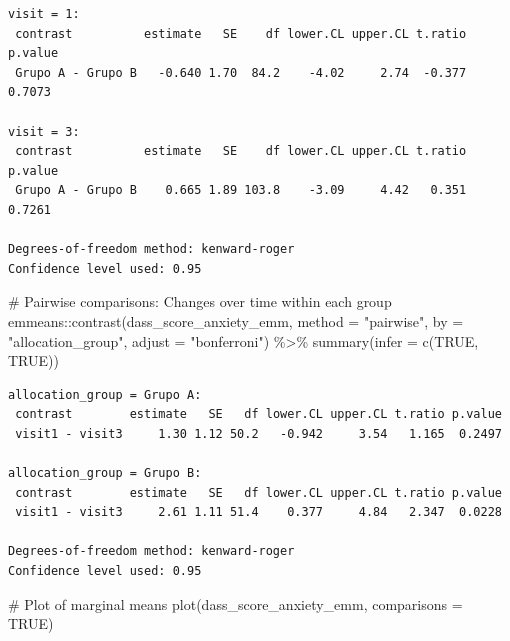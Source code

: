 \documentclass[
  letterpaper,
  DIV=11,
  numbers=noendperiod]{scrartcl}
\newenvironment{Shaded}{\begin{snugshade}}{\end{snugshade}}
\newcommand{\AttributeTok}[1]{\textcolor[rgb]{0.40,0.45,0.13}{#1}}
\newcommand{\CommentTok}[1]{\textcolor[rgb]{0.37,0.37,0.37}{#1}}
\newcommand{\ConstantTok}[1]{\textcolor[rgb]{0.56,0.35,0.01}{#1}}
\newcommand{\FunctionTok}[1]{\textcolor[rgb]{0.28,0.35,0.67}{#1}}
\newcommand{\NormalTok}[1]{\textcolor[rgb]{0.00,0.23,0.31}{#1}}
\newcommand{\SpecialCharTok}[1]{\textcolor[rgb]{0.37,0.37,0.37}{#1}}
\newcommand{\StringTok}[1]{\textcolor[rgb]{0.13,0.47,0.30}{#1}}
\begin{document}
\begin{verbatim}
visit = 1:
 contrast          estimate   SE    df lower.CL upper.CL t.ratio p.value
 Grupo A - Grupo B   -0.640 1.70  84.2    -4.02     2.74  -0.377  0.7073

visit = 3:
 contrast          estimate   SE    df lower.CL upper.CL t.ratio p.value
 Grupo A - Grupo B    0.665 1.89 103.8    -3.09     4.42   0.351  0.7261

Degrees-of-freedom method: kenward-roger 
Confidence level used: 0.95 
\end{verbatim}

\begin{Shaded}
\begin{Highlighting}[]
\CommentTok{\# Pairwise comparisons: Changes over time within each group}
\NormalTok{emmeans}\SpecialCharTok{::}\FunctionTok{contrast}\NormalTok{(dass\_score\_anxiety\_emm, }\AttributeTok{method =} \StringTok{"pairwise"}\NormalTok{, }\AttributeTok{by =} \StringTok{"allocation\_group"}\NormalTok{, }\AttributeTok{adjust =} \StringTok{"bonferroni"}\NormalTok{) }\SpecialCharTok{\%\textgreater{}\%} \FunctionTok{summary}\NormalTok{(}\AttributeTok{infer =} \FunctionTok{c}\NormalTok{(}\ConstantTok{TRUE}\NormalTok{, }\ConstantTok{TRUE}\NormalTok{))}
\end{Highlighting}
\end{Shaded}

\begin{verbatim}
allocation_group = Grupo A:
 contrast        estimate   SE   df lower.CL upper.CL t.ratio p.value
 visit1 - visit3     1.30 1.12 50.2   -0.942     3.54   1.165  0.2497

allocation_group = Grupo B:
 contrast        estimate   SE   df lower.CL upper.CL t.ratio p.value
 visit1 - visit3     2.61 1.11 51.4    0.377     4.84   2.347  0.0228

Degrees-of-freedom method: kenward-roger 
Confidence level used: 0.95 
\end{verbatim}

\begin{Shaded}
\begin{Highlighting}[]
\CommentTok{\# Plot of marginal means}
\FunctionTok{plot}\NormalTok{(dass\_score\_anxiety\_emm, }\AttributeTok{comparisons =} \ConstantTok{TRUE}\NormalTok{)}
\end{Highlighting}
\end{Shaded}
\end{document}
